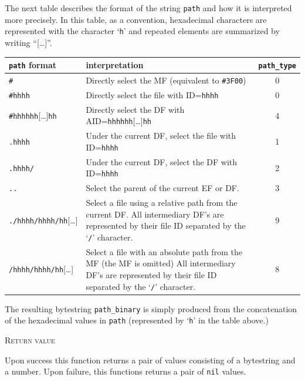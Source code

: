 \documentclass[11pt]{report}
\newcommand{\mansection}[1]{\vspace{0.5em}\par\noindent\textsc{#1}\vspace{0.5em}\par}
\newcommand{\syn}[1]{\texttt{#1}}
\begin{document}
  The next table describes the format of the string \syn{path} and how it is interpreted more precisely. 
  In this table, as a convention, hexadecimal characters are represented with the character `\texttt{h}' 
  and repeated elements are summarized by writing ``[\ldots ]''.

  \vspace{2em}
  \begin{tabular}{|l|p{7cm}|c|}
  \hline
  \syn{path} format 
  & interpretation
  & \syn{path\_type} \\
  \hline
  \hline
  \texttt{\#}
  & Directly select the MF (equivalent to \texttt{\#3F00})
  & 0 \\
  \hline
  \texttt{\#hhhh}
  & Directly select the file with ID=\texttt{hhhh}
  & 0 \\
  \hline
  \texttt{\#hhhhhh}[\ldots ]\texttt{hh}
  & Directly select the DF with AID=\texttt{hhhhhh}[\ldots ]\texttt{hh}    
  & 4 \\
  \hline
  \hline
  \texttt{.hhhh}
  & Under the current DF, select the file with ID=\texttt{hhhh} 
  & 1 \\
  \hline
  \texttt{.hhhh/}
  & Under the current DF, select the DF with ID=\texttt{hhhh}   
  & 2 \\
  \hline
  \texttt{..} 
  & Select the parent of the current EF or DF.
  & 3 \\
  \hline
  \hline
  \texttt{./hhhh/hhhh/hh}[\ldots ]
  & Select a file using a relative path from the current DF. 
    All intermediary DF's are represented by their file ID 
    separated by the `\texttt{/}' character.
  & 9 \\
  \hline
  \texttt{/hhhh/hhhh/hh}[\ldots ] 
  & Select a file with an absolute path from the MF (the MF is omitted) 
    All intermediary DF's are represented by their file ID 
    separated by the `\texttt{/}' character.
   & 8 \\
  \hline
  \end{tabular}
  \vspace{2em}
  

  The resulting bytestring \syn{path\_binary} is simply produced from the concatenation 
  of the hexadecimal values in \syn{path} (represented by `\texttt{h}' in the table above.)

\mansection{Return value}
  Upon success this function returns a pair of values consisting of a bytestring and a number.
  Upon failure, this functions returns a pair of \syn{nil} values.
\end{document}
